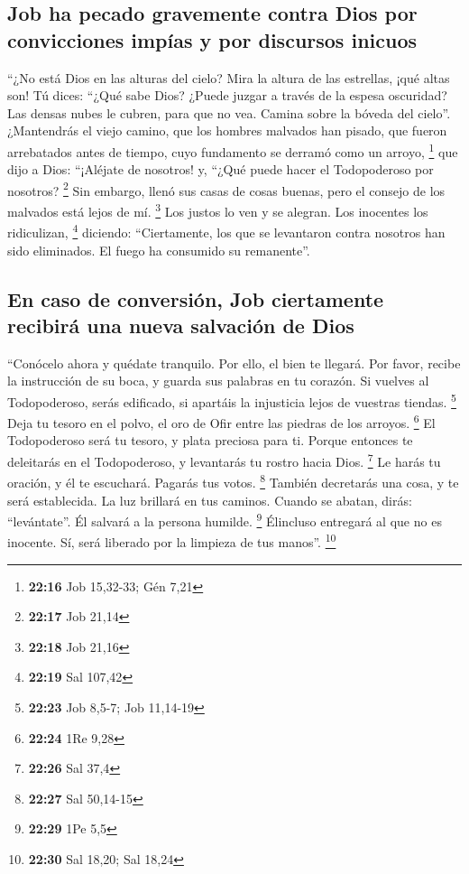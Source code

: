 \begin{paracol}{2}
{\subsection{Job ha pecado gravemente contra Dios por convicciones impías
y por discursos
inicuos}\label{job-ha-pecado-gravemente-contra-dios-por-convicciones-impuxedas-y-por-discursos-inicuos}}

 ``¿No está Dios en las alturas del cielo? Mira la altura
de las estrellas, ¡qué altas son!  Tú dices: ``¿Qué sabe
Dios? ¿Puede juzgar a través de la espesa oscuridad?  Las
densas nubes le cubren, para que no vea. Camina sobre la bóveda del
cielo''.  ¿Mantendrás el viejo camino, que los hombres
malvados han pisado,  que fueron arrebatados antes de
tiempo, cuyo fundamento se derramó como un arroyo, \footnote{\textbf{22:16}
  Job 15,32-33; Gén 7,21}  que dijo a Dios: ``¡Aléjate de
nosotros! y, ``¿Qué puede hacer el Todopoderoso por nosotros?
\footnote{\textbf{22:17} Job 21,14}  Sin embargo, llenó
sus casas de cosas buenas, pero el consejo de los malvados está lejos de
mí. \footnote{\textbf{22:18} Job 21,16}  Los justos lo
ven y se alegran. Los inocentes los ridiculizan, \footnote{\textbf{22:19}
  Sal 107,42}  diciendo: ``Ciertamente, los que se
levantaron contra nosotros han sido eliminados. El fuego ha consumido su
remanente''.

\hypertarget{en-caso-de-conversiuxf3n-job-ciertamente-recibiruxe1-una-nueva-salvaciuxf3n-de-dios}{%
\subsection{En caso de conversión, Job ciertamente recibirá una nueva
salvación de
Dios}\label{en-caso-de-conversiuxf3n-job-ciertamente-recibiruxe1-una-nueva-salvaciuxf3n-de-dios}}

 ``Conócelo ahora y quédate tranquilo. Por ello, el bien
te llegará.  Por favor, recibe la instrucción de su boca,
y guarda sus palabras en tu corazón.  Si vuelves al
Todopoderoso, serás edificado, si apartáis la injusticia lejos de
vuestras tiendas. \footnote{\textbf{22:23} Job 8,5-7; Job 11,14-19}
 Deja tu tesoro en el polvo, el oro de Ofir entre las
piedras de los arroyos. \footnote{\textbf{22:24} 1Re 9,28}
 El Todopoderoso será tu tesoro, y plata preciosa para
ti.  Porque entonces te deleitarás en el Todopoderoso, y
levantarás tu rostro hacia Dios. \footnote{\textbf{22:26} Sal 37,4}
 Le harás tu oración, y él te escuchará. Pagarás tus
votos. \footnote{\textbf{22:27} Sal 50,14-15}  También
decretarás una cosa, y te será establecida. La luz brillará en tus
caminos.  Cuando se abatan, dirás: ``levántate''. Él
salvará a la persona humilde. \footnote{\textbf{22:29} 1Pe 5,5}
 Élincluso entregará al que no es inocente. Sí, será
liberado por la limpieza de tus manos''. \footnote{\textbf{22:30} Sal
  18,20; Sal 18,24}


\end{paracol}
